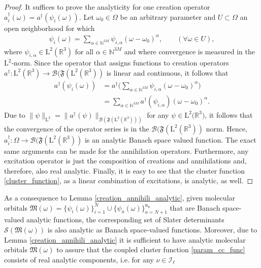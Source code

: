 \documentclass[reqno]{amsart}
\begin{document}
\begin{proof}
    It suffices to prove the analyticity for one creation operator $a^\dagger_i(\omega)=a^\dagger(\psi_i(\omega))$. Let $\omega_0\in\Omega$ be an arbitrary parameter and $U\subset \Omega$ an open neighborhood for which
    \begin{align*}
        \psi_i(\omega)=\sum_{\alpha\in \mathbb{N}^{3M}}\psi_{i,\alpha}(\omega-\omega_0)^\alpha,\qquad(\forall \omega\in U),
    \end{align*}
    where $\psi_{i,\alpha}\in \mathrm{L}^2(\mathbb{R}^3)$ for all $\alpha \in \mathbb{N}^{3M}$ and where convergence is measured in the $\mathrm{L}^2$-norm. Since the operator that assigns functions to creation operators $a^\dagger:\mathrm{L}^2(\mathbb{R}^3)\longrightarrow\mathcal{B}(\mathfrak{F}(\mathrm{L}^2(\mathbb{R}^3))$ is linear and  continuous, it follows that
    \begin{align}\label{series_expansion_creation}
        a^\dagger(\psi_i(\omega))&=a^\dagger\Big(\sum_{\alpha\in \mathbb{N}^{3M}}\psi_{i,\alpha}(\omega-\omega_0)^\alpha\Big)\\
        &=\sum_{\alpha\in \mathbb{N}^{3M}}a^\dagger(\psi_{i,\alpha})(\omega-\omega_0)^\alpha.
    \end{align}
    Due to $\|\psi\|_{\mathrm{L}^2}=\|a^\dagger(\psi)\|_{\mathcal{B}(\mathfrak{F}(\mathrm{L}^2(\mathbb{R}^3)))}$ for any $\psi \in \mathrm{L^2(\mathbb{R}^3})$, it follows that the convergence of the operator series is in the $\mathcal{B}(\mathfrak{F}(\mathrm{L}^2(\mathbb{R}^3))$ norm. Hence, $a^\dagger_i:\Omega\longrightarrow \mathcal{B}(\mathfrak{F}(\mathrm{L}^2(\mathbb{R}^3))$ is an analytic Banach space valued function. The exact same arguments can be made for the annihilation operators. Furthermore, any excitation operator is just the composition of creations and annihilations and, therefore, also real analytic. Finally, it is easy to see that the cluster function \eqref{cluster_function}, as a linear combination of excitations, is analytic, as well. 
\end{proof} As a consequence to Lemma \ref{creation_annihili_analytic}, given molecular orbitals $\mathfrak{M}(\omega)=\lbrace \psi_i(\omega)\rbrace_{i=1}^N\cup \lbrace \psi_a(\omega)\rbrace_{a=N+1}^{\mathrm{n}_\mathrm{b}}$ that are Banach space-valued analytic functions, the corresponding set of Slater determinants $\mathcal{S}(\mathfrak{M}(\omega))$ is also analytic as Banach space-valued functions. Moreover, due to Lemma \ref{creation_annihili_analytic} it is sufficient to have analytic molecular orbitals $\mathfrak{M}(\omega)$ to assure that the coupled cluster function \eqref{param_cc_func} consists of real analytic components, i.e. for any $\nu\in \mathscr{I}_\ell$
\end{document}
